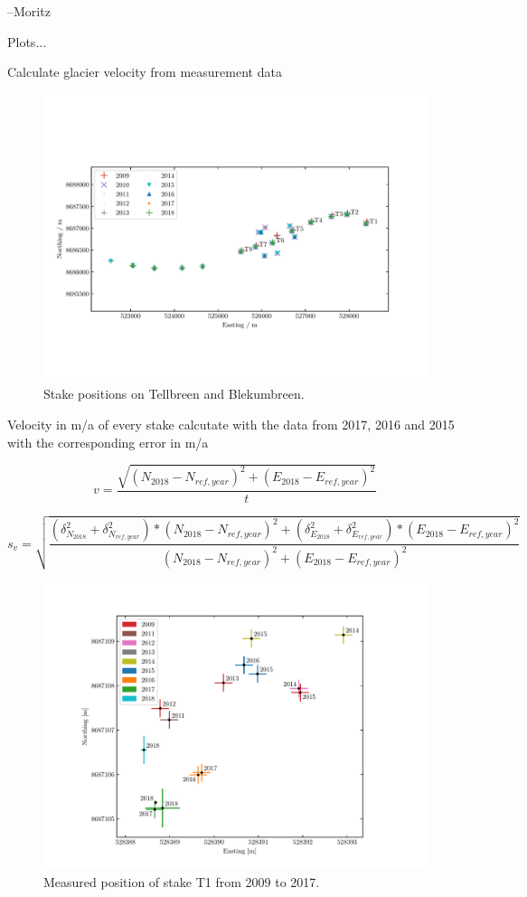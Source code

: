 --Moritz


Plots...

Calculate glacier velocity from measurement data

\begin{figure}[H]
    \centering
    \includegraphics[width=\textwidth]{../fig/stakePositions.pdf}
    \caption{Stake positions on Tellbreen and Blekumbreen.}
    \label{GF:fig:stakepos}
\end{figure}

\begin{table}[h]
	\caption{Velocity in m/a of every stake calcutate with the data from 2017, 2016 and 2015 with the corresponding error in m/a}
	\centering
	\scriptsize
	
	\label{GPS:tab:os_tab}
\end{table}

\begin{equation}
v = \frac{\sqrt{(N_{2018}-N_{ref,year})^2+(E_{2018} - E_{ref,year})^2}}{t}
\end{equation}

\begin{equation}
s_v = \sqrt{\frac{(\delta_{N_{2018}}^2 + \delta_{N_{ref,year}}^2) * (N_{2018}-N_{ref,year})^2 +
(\delta_{E_{2018}}^2 + \delta_{E_{ref,year}}^2) * (E_{2018}-E_{ref,year})^2}
{(N_{2018} - N_{ref,year})^2+ (E_{2018} - E_{ref,year})^2}}
\end{equation}

\begin{figure}[H]
    \centering
    \includegraphics[width=\textwidth]{../fig/T1_2d.pdf}
    \caption{Measured position of stake T1 from 2009 to 2017.}
    \label{GF:fig:T1_2d}
\end{figure}
